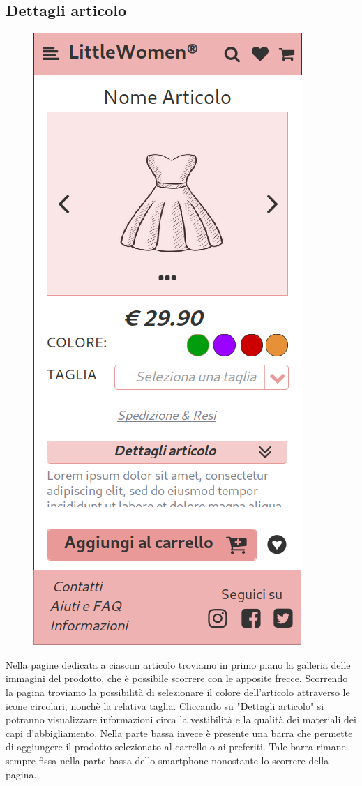 \documentclass[12pt,a4paper]{report}
\begin{document}
\subsection{Dettagli articolo}
\begin{figure}
\centering
\includegraphics[height=0.4\textheight]{"Project Management Sources/Wireframe/WireFrame Screenshot/Mobile/Dettagli articolo"}
\end{figure}
\vspace{2mm}
Nella pagine dedicata a ciascun articolo troviamo in primo piano la galleria delle immagini del prodotto, che è possibile scorrere con le apposite frecce. Scorrendo la pagina troviamo la possibilità di selezionare il colore dell'articolo attraverso le icone circolari, nonchè la relativa taglia. Cliccando su "Dettagli articolo" si potranno visualizzare informazioni circa la vestibilità e la qualità dei materiali dei capi d'abbigliamento. Nella parte bassa invece è presente una barra che permette di aggiungere il prodotto selezionato al carrello o ai preferiti. Tale barra rimane sempre fissa nella parte bassa dello smartphone nonostante lo scorrere della pagina.\\
\newpage
\end{document}
